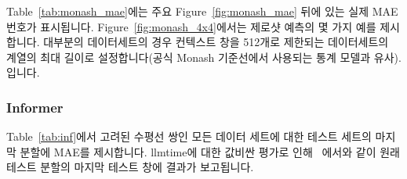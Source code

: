 \documentclass{article}
\begin{document}

Table~\ref{tab:monash_mae}에는 주요 Figure~\ref{fig:monash_mae} 뒤에 있는 실제 MAE 번호가 표시됩니다. Figure~\ref{fig:monash_4x4}에서는 제로샷 예측의 몇 가지 예를 제시합니다. 대부분의 데이터세트의 경우 컨텍스트 창을 512개로 제한되는 데이터세트의 계열의 최대 길이로 설정합니다(공식 Monash 기준선에서 사용되는 통계 모델과 유사). 입니다.


\subsubsection{Informer}
\label{app:informer}
Table~\ref{tab:inf}에서 고려된 수평선 쌍인 모든 데이터 세트에 대한 테스트 세트의 마지막 분할에 MAE를 제시합니다. llmtime에 대한 값비싼 평가로 인해 ~\citep{gruver2023large}에서와 같이 원래 테스트 분할의 마지막 테스트 창에 결과가 보고됩니다.
\end{document}
